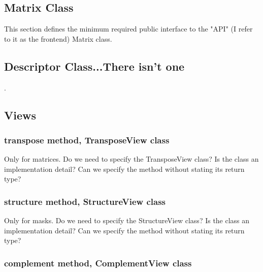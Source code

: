 {


\subsection{Matrix Class}

This section defines the minimum required public interface to the "API" (I refer to it
as the frontend) Matrix class.  

\subsection{Descriptor Class...There isn't one}

.

\subsection{Views}

\subsubsection{transpose method, TransposeView class}

Only for matrices.  Do we need to specify the TransposeView class?
Is the class an implementation detail?  Can we specify the method without stating its return type?


\subsubsection{structure method, StructureView class}

Only for masks.  Do we need to specify the StructureView class?
Is the class an implementation detail?  Can we specify the method without stating its return type?


\subsubsection{complement method, ComplementView class}

}
